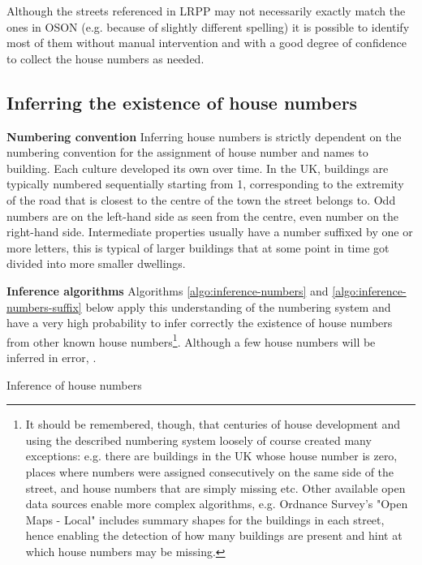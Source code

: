 Although the streets referenced in LRPP may not necessarily exactly match the ones in OSON (e.g. because of slightly different spelling) it is possible to identify most of them without manual intervention and with a good degree of confidence to collect the house numbers as needed.

\subsection{Inferring the existence of house numbers} 

\textbf{Numbering convention} Inferring house numbers is strictly dependent on the numbering convention for the assignment of house number and names to building. Each culture developed its own over time. In the UK, buildings are typically numbered sequentially starting from 1, corresponding to the extremity of the road that is closest to the centre of the town the street belongs to. Odd numbers are on the left-hand side as seen from the centre, even number on the right-hand side. Intermediate properties usually have a number suffixed by one or more letters, this is typical of larger buildings that at some point in time got divided into more smaller dwellings. 
        
\textbf{Inference algorithms} Algorithms \ref{algo:inference-numbers} and \ref{algo:inference-numbers-suffix} below apply this understanding of the numbering system and have a very high probability to infer correctly the existence of house numbers from other known house numbers\footnote{It should be remembered, though, that centuries of house development and using the described numbering system loosely of course created many exceptions: e.g. there are buildings in the UK whose house number is zero, places where numbers were assigned consecutively on the same side of the street, and house numbers that are simply missing etc. Other available open data sources enable more complex algorithms, e.g. Ordnance Survey's "Open Maps - Local" includes summary shapes for the buildings in each street, hence enabling the detection of how many buildings are present and hint at which house numbers may be missing.}. Although a few house numbers will be inferred in error, .

\vspace{5mm}

\begin{algorithm}[H]
    \caption{Inference of house numbers}
    \label{algo:inference-numbers}
\end{algorithm}

